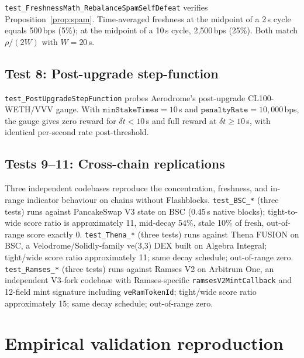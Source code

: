 \documentclass[11pt,a4paper]{article}
\theoremstyle{definition}
\theoremstyle{plain}
\theoremstyle{remark}
\begin{document}
\texttt{test\_FreshnessMath\_RebalanceSpamSelfDefeat} verifies Proposition~\ref{prop:spam}. Time-averaged freshness at the midpoint of a 2\,s cycle equals 500\,bps (5\%); at the midpoint of a 10\,s cycle, 2{,}500\,bps (25\%). Both match $\rho/(2W)$ with $W = 20$\,s.

\subsection*{Test 8: Post-upgrade step-function}\label{app:test8}

\texttt{test\_PostUpgradeStepFunction} probes Aerodrome's post-upgrade CL100-WETH/VVV gauge. With $\texttt{minStakeTimes} = 10$\,s and $\texttt{penaltyRate} = 10{,}000$\,bps, the gauge gives zero reward for $\delta t < 10$\,s and full reward at $\delta t \geq 10$\,s, with identical per-second rate post-threshold.

\subsection*{Tests 9--11: Cross-chain replications}\label{app:test9}

Three independent codebases reproduce the concentration, freshness, and in-range indicator behaviour on chains without Flashblocks. \texttt{test\_BSC\_*} (three tests) runs against PancakeSwap V3 state on BSC (0.45\,s native blocks); tight-to-wide score ratio is approximately 11, mid-decay 54\%, stale 10\% of fresh, out-of-range score exactly 0. \texttt{test\_Thena\_*} (three tests) runs against Thena FUSION on BSC, a Velodrome/Solidly-family ve(3,3) DEX built on Algebra Integral; tight/wide score ratio approximately 11; same decay schedule; out-of-range zero. \texttt{test\_Ramses\_*} (three tests) runs against Ramses V2 on Arbitrum One, an independent V3-fork codebase with Ramses-specific \texttt{ramsesV2MintCallback} and 12-field mint signature including \texttt{veRamTokenId}; tight/wide score ratio approximately 15; same decay schedule; out-of-range zero.

\section{Empirical validation reproduction}\label{app:reproduction}
\end{document}
